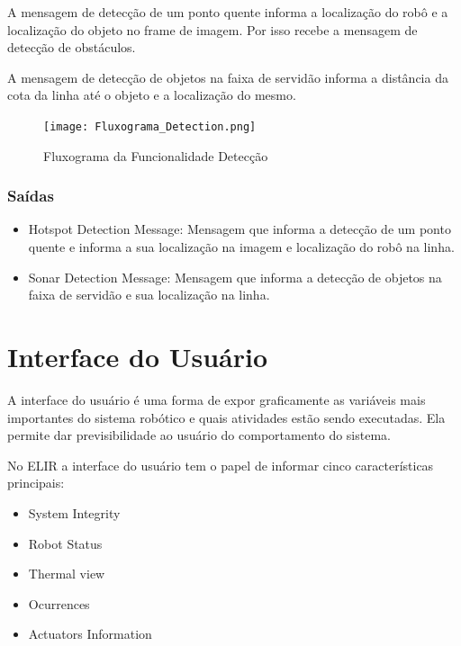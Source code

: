 A mensagem de detecção de um ponto quente informa a localização do robô e a localização do objeto no frame de imagem. Por isso recebe a mensagem de detecção de obstáculos. 

A mensagem de detecção de objetos na faixa de servidão informa a distância da cota da linha até o objeto e a localização do mesmo. 

\begin{figure}[!ht]
	\centering
	\texttt{[image: Fluxograma\_Detection.png]}
	\caption{Fluxograma da Funcionalidade Detecção} \label{FuncDetec}
\end{figure}

\subsubsection{Saídas}

\begin{itemize}
	\item Hotspot Detection Message: Mensagem que informa a detecção de um ponto quente e informa a sua localização na imagem e localização do robô na linha.
	\item Sonar Detection Message: Mensagem que informa a detecção de objetos na faixa de servidão e sua localização na linha.
\end{itemize}
\pagebreak

\section{Interface do Usuário}
\label{sec:ui}

A interface do usuário é uma forma de expor graficamente as variáveis mais importantes do sistema robótico e quais atividades estão sendo executadas. Ela permite dar previsibilidade ao usuário do comportamento do sistema. 

No ELIR a interface do usuário tem o papel de informar cinco características principais:

\begin{itemize}
	\item System Integrity
	\item Robot Status
	\item Thermal view
	\item Ocurrences
	\item Actuators Information
\end{itemize}

